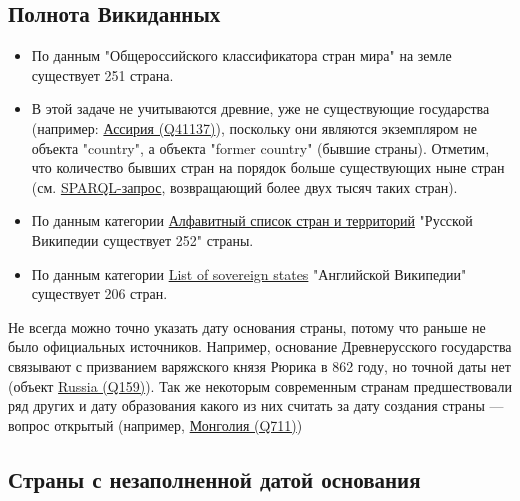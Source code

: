 \subsection{Полнота Викиданных}
\begin{itemize}
    \item По данным "Общероссийского классификатора стран мира" на земле существует 251 страна.
    \item В этой задаче не учитываются древние, уже не существующие государства (например: \href{https://www.wikidata.org/wiki/Q41137}{Ассирия (Q41137)}), поскольку они являются экземпляром не объекта "country", а объекта "former country" (бывшие страны). Отметим, что количество бывших стран на порядок больше существующих ныне стран (см. \href{https://query.wikidata.org/#SELECT%20%3Fitem%20%3Flabel%20%3F_image%20WHERE%20%7B%0A%20%20%3Fitem%20wdt%3AP31%20wd%3AQ3024240.%0A%20%20SERVICE%20wikibase%3Alabel%20%7B%0A%20%20%20%20bd%3AserviceParam%20wikibase%3Alanguage%20%22en%22%20.%20%0A%20%20%20%20%3Fitem%20rdfs%3Alabel%20%3Flabel%0A%20%20%7D%0A%20%20%0AOPTIONAL%20%7B%20%3Fitem%20wdt%3AP18%20%3F_image.%20%7D%0A%7D%0A}{SPARQL-запрос}, возвращающий более двух тысяч таких стран).

    \item По данным категории \href{https://ru.wikipedia.org/wiki/%D0%90%D0%BB%D1%84%D0%B0%D0%B2%D0%B8%D1%82%D0%BD%D1%8B%D0%B9_%D1%81%D0%BF%D0%B8%D1%81%D0%BE%D0%BA_%D1%81%D1%82%D1%80%D0%B0%D0%BD_%D0%B8_%D1%82%D0%B5%D1%80%D1%80%D0%B8%D1%82%D0%BE%D1%80%D0%B8%D0%B9}{Алфавитный список стран и территорий} "Русской Википедии существует  252"  страны.

    \item По данным категории \href{https://www.wikipedia.org/wiki/en:List_of_sovereign_states}{List of sovereign states} "Английской Википедии" существует 206 стран.
    \end{itemize}

Не всегда можно точно указать дату основания страны, потому что раньше не было официальных источников. Например, основание Древнерусского государства связывают с призванием варяжского князя Рюрика в 862 году, но точной даты нет (объект \href{https://www.wikidata.org/wiki/Q159} {Russia (Q159)}). Так же некоторым современным странам предшествовали ряд других и дату образования какого из них считать за дату создания страны —  вопрос открытый (например, \href{https://www.wikidata.org/wiki/Q711}{Монголия (Q711)})


\subsection{Страны с незаполненной датой основания}

